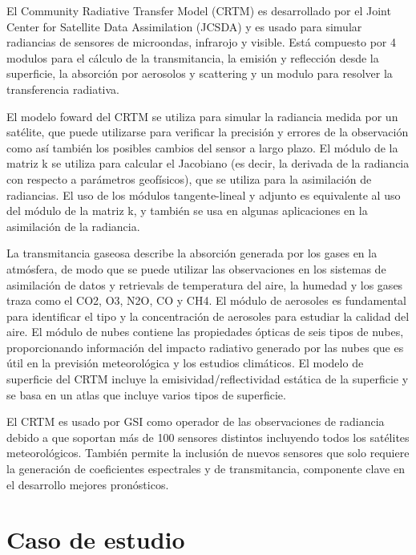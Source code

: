\documentclass[12pt,twoside]{reedthesis}
\begin{document}
El Community Radiative Transfer Model (CRTM) es desarrollado por el Joint Center for Satellite Data Assimilation (JCSDA) y es usado para simular radiancias de sensores de microondas, infrarojo y visible. Está compuesto por 4 modulos para el cálculo de la transmitancia, la emisión y reflección desde la superficie, la absorción por aerosolos y scattering y un modulo para resolver la transferencia radiativa.

El modelo foward del CRTM se utiliza para simular la radiancia medida por un satélite, que puede utilizarse para verificar la precisión y errores de la observación como así también los posibles cambios del sensor a largo plazo. El módulo de la matriz k se utiliza para calcular el Jacobiano (es decir, la derivada de la radiancia con respecto a parámetros geofísicos), que se utiliza para la asimilación de radiancias. El uso de los módulos tangente-lineal y adjunto es equivalente al uso del módulo de la matriz k, y también se usa en algunas aplicaciones en la asimilación de la radiancia.

La transmitancia gaseosa describe la absorción generada por los gases en la atmósfera, de modo que se puede utilizar las observaciones en los sistemas de asimilación de datos y retrievals de temperatura del aire, la humedad y los gases traza como el CO2, O3, N2O, CO y CH4. El módulo de aerosoles es fundamental para identificar el tipo y la concentración de aerosoles para estudiar la calidad del aire. El módulo de nubes contiene las propiedades ópticas de seis tipos de nubes, proporcionando información del impacto radiativo generado por las nubes que es útil en la previsión meteorológica y los estudios climáticos. El modelo de superficie del CRTM incluye la emisividad/reflectividad estática de la superficie y se basa en un atlas que incluye varios tipos de superficie.

El CRTM es usado por GSI como operador de las observaciones de radiancia debido a que soportan más de 100 sensores distintos incluyendo todos los satélites meteorológicos. También permite la inclusión de nuevos sensores que solo requiere la generación de coeficientes espectrales y de transmitancia, componente clave en el desarrollo mejores pronósticos.

\hypertarget{caso-de-estudio}{%
\section{Caso de estudio}\label{caso-de-estudio}}
\end{document}
